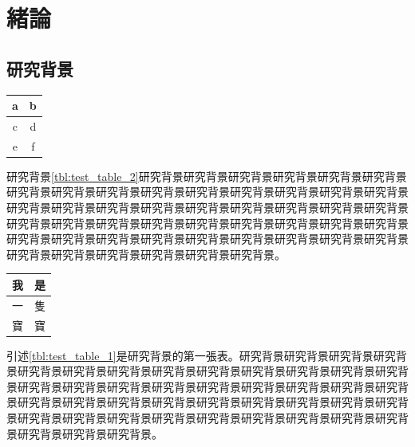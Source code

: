 
\chapter{緒論}

\section{研究背景}

\begingroup
\centering
\begin{tabular}{|c|c|}
  \hline
  a & b \\\hline
  c & d \\\hline
  e & f \\\hline
  \hline
\end{tabular}
\captionsetup{type=table}
\label{tbl:test_table_2}

\endgroup

研究背景\ref{tbl:test_table_2}研究背景研究背景研究背景研究背景研究背景研究背景研究背景研究背景研究背景研究背景研究背景研究背景研究背景研究背景研究背景研究背景研究背景研究背景研究背景研究背景研究背景研究背景研究背景研究背景研究背景研究背景研究背景研究背景研究背景研究背景研究背景研究背景研究背景研究背景研究背景研究背景研究背景研究背景研究背景研究背景研究背景研究背景研究背景研究背景研究背景研究背景研究背景研究背景。\par

\newpage
\begingroup
\centering
\begin{tabular}{|c|c|}
  \hline
  我 & 是 \\\hline
  一 & 隻 \\\hline
  寶 & 寶 \\\hline
  \hline
\end{tabular}
\label{tbl:test_table_1}
\endgroup

引述\ref{tbl:test_table_1}是研究背景的第一張表。研究背景研究背景研究背景研究背景研究背景研究背景研究背景研究背景研究背景研究背景研究背景研究背景研究背景研究背景研究背景研究背景研究背景研究背景研究背景研究背景研究背景研究背景研究背景研究背景研究背景研究背景研究背景研究背景研究背景研究背景研究背景研究背景研究背景研究背景研究背景研究背景研究背景研究背景研究背景研究背景研究背景研究背景研究背景。

\newpage

